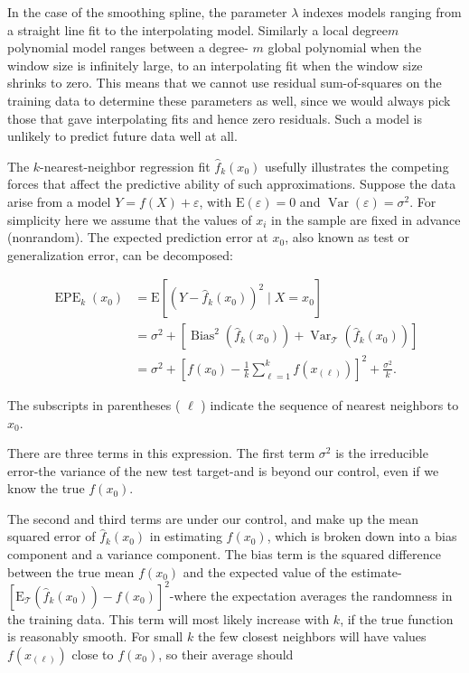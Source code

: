 \documentclass[10pt]{article}
\begin{document}
In the case of the smoothing spline, the parameter $\lambda$ indexes models ranging from a straight line fit to the interpolating model. Similarly a local degree$m$ polynomial model ranges between a degree- $m$ global polynomial when the window size is infinitely large, to an interpolating fit when the window size shrinks to zero. This means that we cannot use residual sum-of-squares on the training data to determine these parameters as well, since we would always pick those that gave interpolating fits and hence zero residuals. Such a model is unlikely to predict future data well at all.

The $k$-nearest-neighbor regression fit $\hat{f}_{k}\left(x_{0}\right)$ usefully illustrates the competing forces that affect the predictive ability of such approximations. Suppose the data arise from a model $Y=f(X)+\varepsilon$, with $\mathrm{E}(\varepsilon)=0$ and $\operatorname{Var}(\varepsilon)=\sigma^{2}$. For simplicity here we assume that the values of $x_{i}$ in the sample are fixed in advance (nonrandom). The expected prediction error at $x_{0}$, also known as test or generalization error, can be decomposed:


\begin{align*}
\operatorname{EPE}_{k}\left(x_{0}\right) & =\mathrm{E}\left[\left(Y-\hat{f}_{k}\left(x_{0}\right)\right)^{2} \mid X=x_{0}\right] \\
& =\sigma^{2}+\left[\operatorname{Bias}^{2}\left(\hat{f}_{k}\left(x_{0}\right)\right)+\operatorname{Var}_{\mathcal{T}}\left(\hat{f}_{k}\left(x_{0}\right)\right)\right]  \tag{2.46}\\
& =\sigma^{2}+\left[f\left(x_{0}\right)-\frac{1}{k} \sum_{\ell=1}^{k} f\left(x_{(\ell)}\right)\right]^{2}+\frac{\sigma^{2}}{k} . \tag{2.47}
\end{align*}


The subscripts in parentheses ( $\ell$ ) indicate the sequence of nearest neighbors to $x_{0}$.

There are three terms in this expression. The first term $\sigma^{2}$ is the irreducible error-the variance of the new test target-and is beyond our control, even if we know the true $f\left(x_{0}\right)$.

The second and third terms are under our control, and make up the mean squared error of $\hat{f}_{k}\left(x_{0}\right)$ in estimating $f\left(x_{0}\right)$, which is broken down into a bias component and a variance component. The bias term is the squared difference between the true mean $f\left(x_{0}\right)$ and the expected value of the estimate- $\left[\mathrm{E}_{\mathcal{T}}\left(\hat{f}_{k}\left(x_{0}\right)\right)-f\left(x_{0}\right)\right]^{2}$-where the expectation averages the randomness in the training data. This term will most likely increase with $k$, if the true function is reasonably smooth. For small $k$ the few closest neighbors will have values $f\left(x_{(\ell)}\right)$ close to $f\left(x_{0}\right)$, so their average should
\end{document}
